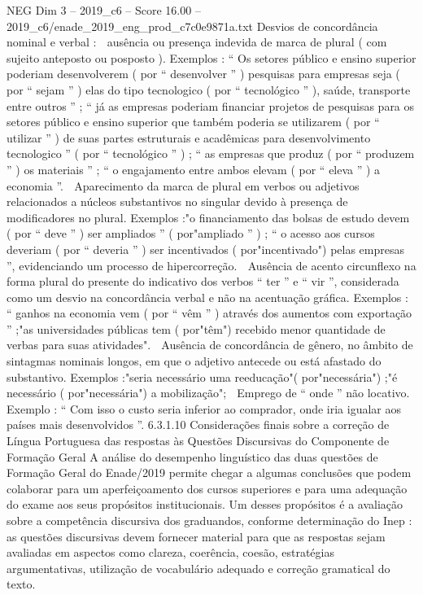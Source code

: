 \begin{textsample}{NEG Dim 3 – 2019\_c6 – Score 16.00 – 2019\_c6/enade\_2019\_eng\_prod\_c7c0e9871a.txt}
Desvios de concordância nominal e verbal :  ausência ou presença indevida de marca de plural ( com sujeito anteposto ou posposto ).
Exemplos : “ Os setores público e ensino superior poderiam desenvolverem ( por “ desenvolver ” ) pesquisas para empresas seja ( por “ sejam ” ) elas do tipo tecnologico ( por “ tecnológico ” ), saúde, transporte entre outros ” ; “ já as empresas poderiam financiar projetos de pesquisas para os setores público e ensino superior que também poderia se utilizarem ( por “ utilizar ” ) de suas partes estruturais e acadêmicas para desenvolvimento tecnologico ” ( por “ tecnológico ” ) ; “ as empresas que produz ( por “ produzem ” ) os materiais ” ; “ o engajamento entre ambos elevam ( por “ eleva ” ) a economia ”.  Aparecimento da marca de plural em verbos ou adjetivos relacionados a núcleos substantivos no singular devido à presença de modificadores no plural.
Exemplos :"o financiamento das bolsas de estudo devem ( por “ deve ” ) ser ampliados ” ( por"ampliado ” ) ; “ o acesso aos cursos deveriam ( por “ deveria ” ) ser incentivados ( por"incentivado") pelas empresas ”, evidenciando um processo de hipercorreção.  Ausência de acento circunflexo na forma plural do presente do indicativo dos verbos “ ter ” e “ vir ”, considerada como um desvio na concordância verbal e não na acentuação gráfica.
Exemplos : “ ganhos na economia vem ( por “ vêm ” ) através dos aumentos com exportação ” ;"as universidades públicas tem ( por"têm") recebido menor quantidade de verbas para suas atividades".  Ausência de concordância de gênero, no âmbito de sintagmas nominais longos, em que o adjetivo antecede ou está afastado do substantivo.
Exemplos :"seria necessário uma reeducação"( por"necessária") ;"é necessário ( por"necessária") a mobilização";  Emprego de “ onde ” não locativo.
Exemplo : “ Com isso o custo seria inferior ao comprador, onde iria igualar aos países mais desenvolvidos ”. 6.3.1.10 Considerações finais sobre a correção de Língua Portuguesa das respostas às Questões Discursivas do Componente de Formação Geral A análise do desempenho linguístico das duas questões de Formação Geral do Enade/2019 permite chegar a algumas conclusões que podem colaborar para um aperfeiçoamento dos cursos superiores e para uma adequação do exame aos seus propósitos institucionais.
Um desses propósitos é a avaliação sobre a competência discursiva dos graduandos, conforme determinação do Inep : as questões discursivas devem fornecer material para que as respostas sejam avaliadas em aspectos como clareza, coerência, coesão, estratégias argumentativas, utilização de vocabulário adequado e correção gramatical do texto.

\end{textsample}
